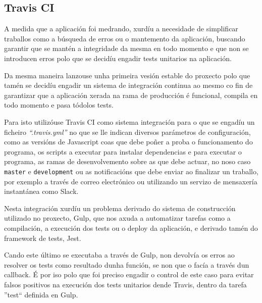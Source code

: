     \subsection{Travis CI}
    \label{sec:travis}
    A medida que a aplicación foi medrando, xurdíu a necesidade de simplificar 
traballos como a búsqueda de erros ou o mantemento da aplicación, buscando 
garantir que se mantén a integridade da mesma en todo momento e que non se 
introducen erros polo que se decidíu engadir tests unitarios na aplicación.

    Da mesma maneira lanzouse unha primeira vesión estable do proxecto polo 
que tamén se decidíu engadir un sistema de integración continua ao mesmo co 
fin de garantizar que a aplicación xerada na rama de producción é funcional, 
compila en todo momento e pasa tódolos tests.

    Para isto utilizóuse Travis CI como sistema integración para o que se 
engadíu un ficheiro \emph{``.travis.yml''} no que se lle indican diversos 
parámetros de configuración, como as versións de Javascript coas que debe poñer 
a proba o funcionamento do programa, os scripts a executar para instalar 
dependencias e para executar o programa, as ramas de desenvolvemento sobre as 
que debe actuar, no noso caso \lstinline{master} e \lstinline{development} ou 
as notificacións 
que debe enviar ao finalizar un traballo, por exemplo a través de correo 
electrónico ou utilizando un servizo de mensaxería instantánea como Slack.

    Nesta integración xurdíu un problema derivado do sistema de construcción 
utilizado no proxecto, Gulp, que nos axuda a automatizar tarefas como a 
compilación, a execución dos tests ou o deploy da aplicación, e derivado tamén 
do framework de tests, Jest.

    Cando este último se executaba a través de Gulp, non devolvía os 
erros ao resolver os tests como resultado dunha función, se non que o facía a 
través dun callback. É por iso polo que foi preciso engadir o control de este 
caso para evitar falsos positivos na execución dos tests unitarios dende 
Travis, dentro da tarefa ''test`` definida en Gulp.
